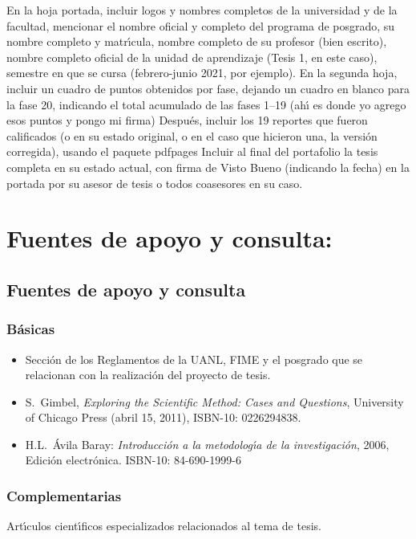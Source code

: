 \documentclass[10 pt]{article}
\begin{document}
En la hoja portada, incluir logos y nombres completos de la
universidad y de la facultad, mencionar el nombre oficial y completo
del programa de posgrado, su nombre completo y matr\'{\i}cula, nombre
completo de su profesor (bien escrito), nombre completo oficial de la
unidad de aprendizaje (Tesis 1, en este caso), semestre en que se
cursa (febrero-junio 2021, por ejemplo). En la segunda hoja, incluir
un cuadro de puntos obtenidos por fase, dejando un cuadro en blanco
para la fase 20, indicando el total acumulado de las fases 1--19 (ah\'{\i}
es donde yo agrego esos puntos y pongo mi firma) Despu\'{e}s, incluir los
19 reportes que fueron calificados (o en su estado original, o en el
caso que hicieron una, la versi\'{o}n corregida), usando el paquete
pdfpages Incluir al final del portafolio la tesis completa en su
estado actual, con firma de Visto Bueno (indicando la fecha) en la
portada por su asesor de tesis o todos coasesores en su caso.

\section{Fuentes de apoyo y consulta:}
\subsection{Fuentes de apoyo y consulta}
\subsubsection{B\'{a}sicas}

 \begin{itemize}[itemsep=0em]

   \item{Secci\'{o}n de los Reglamentos de la UANL, FIME y el posgrado que se relacionan con la realizaci\'{o}n del proyecto de tesis.}

    \item{S.\ {\sc Gimbel}, {\em Exploring the Scientific Method:
          Cases and Questions}, University of Chicago Press (abril 15,
        2011), ISBN-10: 0226294838.}

      \item{ H.L.\ {\sc \'{A}vila Baray}: {\em Introducci\'{o}n a la
            metodolog\'{\i}a de la investigaci\'{o}n}, 2006, Edici\'{o}n electr\'{o}nica. ISBN-10: 84-690-1999-6}
   
\end{itemize}

\subsubsection{Complementarias}

Art\'{\i}culos cient\'{\i}ficos especializados relacionados al tema de tesis.

\label{final} %


\end{document}
